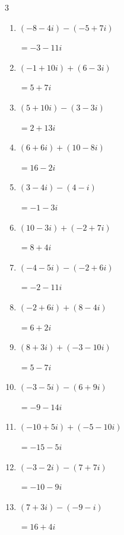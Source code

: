 \begin{multicols}{3}
\begin{enumerate}
        $\displaystyle =-3-12i$

  \item $\displaystyle (-8-4i) - (-5+7i)$

        $\displaystyle =-3-11i$

\columnbreak %

  \item $\displaystyle (-1+10i) + (6-3i)$

        $\displaystyle =5+7i$

  \item $\displaystyle (5+10i) - (3-3i)$

        $\displaystyle =2+13i$

  \item $\displaystyle (6+6i) + (10-8i)$

        $\displaystyle =16-2i$

  \item $\displaystyle (3-4i) - (4-i)$

        $\displaystyle =-1-3i$

  \item $\displaystyle (10-3i) + (-2+7i)$

        $\displaystyle =8+4i$

  \item $\displaystyle (-4-5i) - (-2+6i)$

        $\displaystyle =-2-11i$

  \item $\displaystyle (-2+6i) + (8-4i)$

        $\displaystyle =6+2i$

  \item $\displaystyle (8+3i) + (-3-10i)$

        $\displaystyle =5-7i$

  \item $\displaystyle (-3-5i) - (6+9i)$

        $\displaystyle =-9-14i$

  \item $\displaystyle (-10+5i) + (-5-10i)$

        $\displaystyle =-15-5i$

  \item $\displaystyle (-3-2i) - (7+7i)$

        $\displaystyle =-10-9i$

  \item $\displaystyle (7+3i) - (-9-i)$

        $\displaystyle =16+4i$


\end{enumerate}
\end{multicols}
